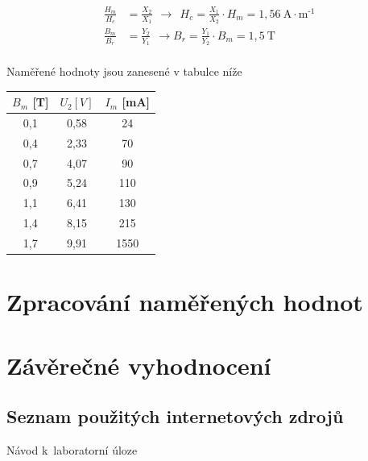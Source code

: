 \documentclass[a4paper,12pt]{article}   %
\begin{document}
\begin{equation}
  \begin{split}
    \frac{H_m}{H_c} &= \frac{X_2}{X_1} ~~\rightarrow~~H_c = \frac{X_1}{X_2}\cdot H_m = 1,56~\text{A}\cdot\text{m}^\text{-1}\\
    \frac{B_m}{B_r} &= \frac{Y_2}{Y_1} ~~\rightarrow B_r = \frac{Y_1}{Y_2}\cdot B_m = 1,5~\text{T}\\
  \end{split}
\end{equation}

Naměřené hodnoty jsou zanesené v tabulce níže
\begin{table}[h!]
  \centering
  \begin{tabular}{|c|c|c|}
  \hline
  $B_m$ [T] &$U_\text{2} [V]$& $I_m$ [mA]\\\hline\hline
  0,1 & 0,58  & 24   \\ \hline
  0,4 & 2,33  & 70   \\ \hline
  0,7 & 4,07  & 90   \\ \hline
  0,9 & 5,24  & 110  \\ \hline
  1,1 & 6,41  & 130  \\ \hline
  1,4 & 8,15  & 215  \\ \hline
  1,7 & 9,91  & 1550 \\ \hline
  \end{tabular}
\end{table}



\section{Zpracování naměřených hodnot}
\label{chap:zpracovani_hodnot}



\section{Závěrečné vyhodnocení}
\label{chap:zaver}



\clearpage
\renewcommand{\refname}{Seznam použité literatury a~zdrojů informací} 

\begin{thebibliography}{99}

\subsection*{Seznam použitých internetových zdrojů}
     Návod k~laboratorní úloze
    
\end{thebibliography}
\end{document}
